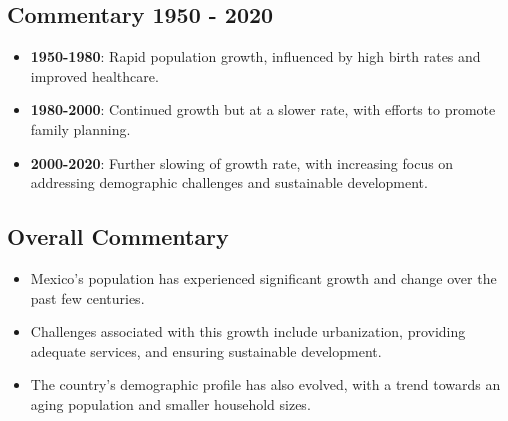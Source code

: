 \subsection*{Commentary 1950 - 2020}
\begin{itemize}
    \item \textbf{1950-1980}: Rapid population growth, influenced by high birth rates and improved healthcare.
    \item \textbf{1980-2000}: Continued growth but at a slower rate, with efforts to promote family planning.
    \item \textbf{2000-2020}: Further slowing of growth rate, with increasing focus on addressing demographic challenges and sustainable development.
\end{itemize}

\subsection*{Overall Commentary}
\begin{itemize}
    \item Mexico’s population has experienced significant growth and change over the past few centuries.
    \item Challenges associated with this growth include urbanization, providing adequate services, and ensuring sustainable development.
    \item The country’s demographic profile has also evolved, with a trend towards an aging population and smaller household sizes.
\end{itemize}